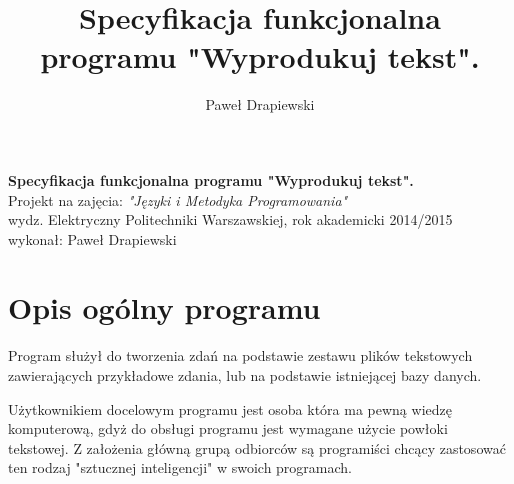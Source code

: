 \documentclass[a4paper,11pt]{article}
\author{Paweł Drapiewski}
\title{Specyfikacja funkcjonalna programu "Wyprodukuj tekst". }
\begin{document}
	\begin{center}
		\textbf{\huge Specyfikacja funkcjonalna programu "Wyprodukuj tekst".  } 
		\\ Projekt na zajęcia: \textit{"Języki i Metodyka Programowania"}
		\\ wydz. Elektryczny Politechniki Warszawskiej, rok akademicki 2014/2015
		\\ wykonał: Paweł Drapiewski
	\end{center}

\section{Opis ogólny programu}

	Program służył do tworzenia zdań na podstawie zestawu plików tekstowych zawierających przykładowe zdania, lub na podstawie istniejącej bazy danych.
	
	Użytkownikiem docelowym programu jest osoba która ma pewną wiedzę komputerową, gdyż do obsługi programu jest wymagane użycie powłoki tekstowej. Z założenia główną grupą odbiorców są programiści chcący zastosować ten rodzaj "sztucznej inteligencji" w swoich programach. 
	
\end{document}
